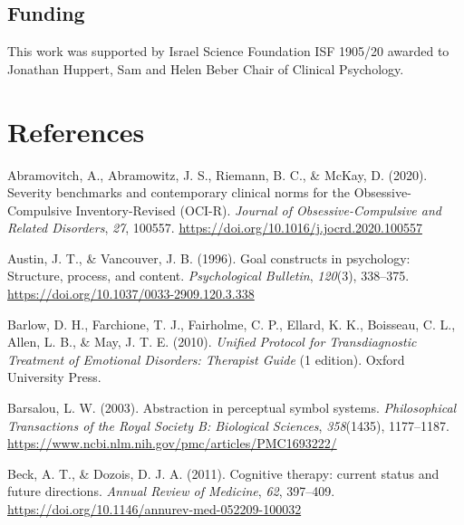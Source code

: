 \documentclass[
  man,floatsintext]{apa7}
\newlength{\cslhangindent}
\newlength{\cslentryspacingunit} %
\newenvironment{CSLReferences}[2] %
 {%
  \setlength{\parindent}{0pt}
  \ifodd #1
  \let\oldpar\par
  \def\par{\hangindent=\cslhangindent\oldpar}
  \fi
  \setlength{\parskip}{#2\cslentryspacingunit}
 }%
 {}
\begin{document}
\subsection{Funding}\label{funding}

This work was supported by Israel Science Foundation ISF 1905/20 awarded to Jonathan Huppert, Sam and Helen Beber Chair of Clinical Psychology.

\newpage

\section{References}\label{references}

\hypertarget{refs}{}
\begin{CSLReferences}{1}{0}
\leavevmode{}%
Abramovitch, A., Abramowitz, J. S., Riemann, B. C., \& McKay, D. (2020). Severity benchmarks and contemporary clinical norms for the Obsessive-Compulsive Inventory-Revised (OCI-R). \emph{Journal of Obsessive-Compulsive and Related Disorders}, \emph{27}, 100557. \url{https://doi.org/10.1016/j.jocrd.2020.100557}

\leavevmode{}%
Austin, J. T., \& Vancouver, J. B. (1996). Goal constructs in psychology: Structure, process, and content. \emph{Psychological Bulletin}, \emph{120}(3), 338--375. \url{https://doi.org/10.1037/0033-2909.120.3.338}

\leavevmode{}%
Barlow, D. H., Farchione, T. J., Fairholme, C. P., Ellard, K. K., Boisseau, C. L., Allen, L. B., \& May, J. T. E. (2010). \emph{Unified Protocol for Transdiagnostic Treatment of Emotional Disorders: Therapist Guide} (1 edition). Oxford University Press.

\leavevmode{}%
Barsalou, L. W. (2003). Abstraction in perceptual symbol systems. \emph{Philosophical Transactions of the Royal Society B: Biological Sciences}, \emph{358}(1435), 1177--1187. \url{https://www.ncbi.nlm.nih.gov/pmc/articles/PMC1693222/}

\leavevmode{}%
Beck, A. T., \& Dozois, D. J. A. (2011). Cognitive therapy: current status and future directions. \emph{Annual Review of Medicine}, \emph{62}, 397--409. \url{https://doi.org/10.1146/annurev-med-052209-100032}


\end{CSLReferences}
\end{document}

